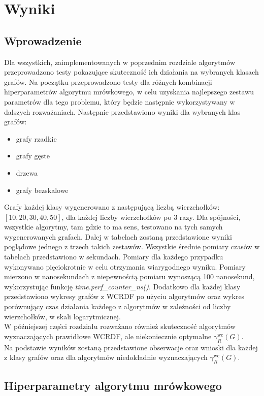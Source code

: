 \chapter{Wyniki}

\section{Wprowadzenie}

Dla wszystkich, zaimplementowanych w poprzednim rozdziale algorytmów przeprowadzono testy pokazujące skuteczność ich działania na wybranych klasach grafów. Na początku przeprowadzono testy dla różnych kombinacji hiperparametrów algorytmu mrówkowego, w celu uzyskania najlepszego zestawu parametrów dla tego problemu, który będzie następnie wykorzystywany w dalszych rozważaniach. Następnie przedstawiono wyniki dla wybranych klas grafów:
\begin{itemize}
    \item grafy rzadkie
    \item grafy gęste
    \item drzewa
    \item grafy bezskalowe
\end{itemize}
Grafy każdej klasy wygenerowano z następującą liczbą wierzchołków: $[10, 20, 30, 40, 50]$, dla każdej liczby wierzchołków po 3 razy. Dla spójności, wszystkie algorytmy, tam gdzie to ma sens, testowano na tych samych wygenerowanych grafach. Dalej w tabelach zostaną przedstawione wyniki poglądowe jednego z trzech takich zestawów. 
Wszystkie średnie pomiary czasów w tabelach przedstawiono w sekundach. Pomiary dla każdego przypadku wykonywano pięciokrotnie w celu otrzymania wiarygodnego wyniku. Pomiary mierzono w nanosekundach z niepewnością pomiaru wynoszącą 100 nanosekund, wykorzystując funkcję \textit{time.perf\_counter\_ns()}. Dodatkowo dla każdej klasy przedstawiono wykresy grafów z WCRDF po użyciu algorytmów oraz wykres porównujący czas działania każdego z algorytmów w zależności od liczby wierzchołków, w skali logarytmicznej.\\
W późniejszej części rozdziału rozważano również skuteczność algorytmów wyznaczających prawidłowe WCRDF, ale niekoniecznie optymalne $\gamma^{\text{wc}}_R(G)$.\\
Na podstawie wyników zostaną przedstawione obserwacje oraz wnioski dla każdej z klasy grafów oraz dla algorytmów niedokładnie wyznaczających $\gamma^{\text{wc}}_R(G)$.

\section{Hiperparametry algorytmu mrówkowego}

